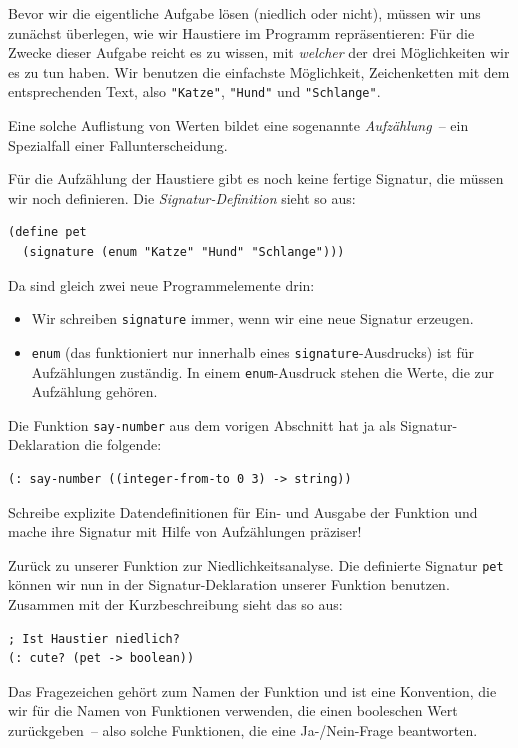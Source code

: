 Bevor wir die eigentliche Aufgabe lösen (niedlich oder nicht), müssen
wir uns zunächst überlegen, wie wir Haustiere im Programm
repräsentieren: Für die Zwecke dieser Aufgabe reicht es zu wissen, mit
\emph{welcher} der drei Möglichkeiten wir es zu tun haben.  Wir
benutzen die einfachste Möglichkeit, Zeichenketten mit dem
entsprechenden Text, also \lstinline{"Katze"}, \lstinline{"Hund"} und
\lstinline{"Schlange"}.

Eine solche Auflistung von Werten bildet eine sogenannte
\textit{Aufzählung}~-- ein Spezialfall einer
Fallunterscheidung.

Für die Aufzählung der Haustiere gibt es noch keine fertige Signatur,
die müssen wir noch definieren.  Die
\textit{Signatur-Definition} sieht so
aus:
\label{sec:pet}\label{page:signature}
%
\begin{lstlisting}
(define pet
  (signature (enum "Katze" "Hund" "Schlange")))
\end{lstlisting}
%
Da sind gleich zwei neue Programmelemente drin:
%
\begin{itemize}
\item Wir schreiben
  \lstinline{signature} immer, wenn wir eine
  neue Signatur erzeugen.
\item \lstinline{enum} (das funktioniert
  nur innerhalb eines \lstinline{signature}-Ausdrucks) ist für
  Aufzählungen zuständig.  In einem \lstinline{enum}-Ausdruck stehen
  die Werte, die zur Aufzählung gehören.
\end{itemize}
%
\begin{aufgabeinline}
  Die Funktion \lstinline{say-number} aus dem vorigen Abschnitt hat ja als
  Signatur-Deklaration die folgende:
\begin{lstlisting}
(: say-number ((integer-from-to 0 3) -> string))
\end{lstlisting}
  Schreibe explizite Datendefinitionen für Ein- und Ausgabe der Funktion
  und mache ihre Signatur mit Hilfe von Aufzählungen präziser!
\end{aufgabeinline}
%
Zurück zu unserer Funktion zur Niedlichkeitsanalyse.  Die definierte
Signatur \lstinline{pet} können wir nun in der Signatur-Deklaration
unserer Funktion benutzen.  Zusammen mit der Kurzbeschreibung sieht
das so aus:
%
\begin{lstlisting}
; Ist Haustier niedlich?
(: cute? (pet -> boolean))
\end{lstlisting}
%
Das Fragezeichen gehört zum Namen der Funktion und ist eine
Konvention, die wir für die Namen von Funktionen verwenden, die einen
booleschen Wert zurückgeben~-- also solche Funktionen, die eine
Ja-/Nein-Frage beantworten.

